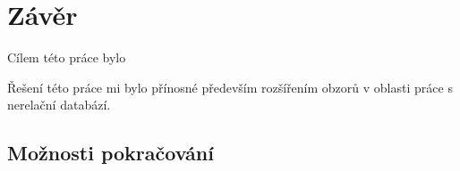 \chapter{Závěr}
Cílem této práce bylo \blindtext

\blindtext %

Řešení této práce mi bylo přínosné především rozšířením obzorů v oblasti práce s nerelační databází.

\section{Možnosti pokračování}
\blindtext